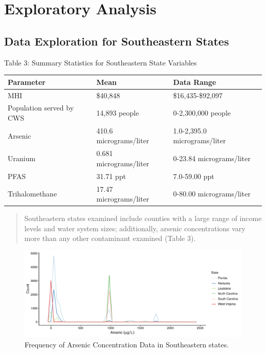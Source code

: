 \documentclass[12pt,]{article}
\begin{document}
\hypertarget{exploratory-analysis}{%
\section{Exploratory Analysis}\label{exploratory-analysis}}

\hypertarget{data-exploration-for-southeastern-states}{%
\subsection{Data Exploration for Southeastern
States}\label{data-exploration-for-southeastern-states}}

Table 3: Summary Statistics for Southeastern State Variables

\begin{longtable}[]{@{}lll@{}}
\toprule
\textbf{Parameter} & \textbf{Mean} & \textbf{Data Range}\tabularnewline
\midrule
\endhead
MHI & \$40,848 & \$16,435-\$92,097\tabularnewline
Population served by CWS & 14,893 people & 0-2,300,000
people\tabularnewline
Arsenic & 410.6 micrograms/liter & 1.0-2,395.0
micrograms/liter\tabularnewline
Uranium & 0.681 micrograms/liter & 0-23.84
micrograms/liter\tabularnewline
PFAS & 31.71 ppt & 7.0-59.00 ppt\tabularnewline
Trihalomethane & 17.47 micrograms/liter & 0-80.00
micrograms/liter\tabularnewline
\bottomrule
\end{longtable}

\begin{quote}
Southeastern states examined include counties with a large range of
income levels and water system sizes; additionally, arsenic
concentrations vary more than any other contaminant examined (Table 3).
\end{quote}

\begin{figure}
\centering
\includegraphics{Project_Template_files/figure-latex/figs-1.pdf}
\caption{Frequency of Arsenic Concentration Data in Southeastern
states.}
\end{figure}
\end{document}
